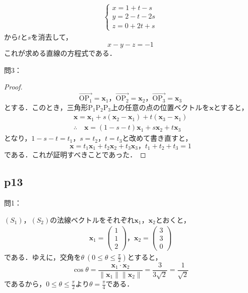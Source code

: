 \documentclass[dvipdfmx,uplatex,11pt]{jsarticle}
\theoremstyle{definition}
\begin{document}
\begin{leftbar}
    \begin{align*}
        \begin{cases}
            x=1+t-s \\
            y=2-t -2s \\
            z=0+2t+s
        \end{cases}
    \end{align*}
    から$t$と$s$を消去して，
    \[
        x-y-z=-1
    \]
    これが求める直線の方程式である．
\end{leftbar}

問3：

\begin{leftbar}
    \begin{proof}
        \[
            \overrightarrow{\mathrm{OP_1}}=\bm{x}_1，\overrightarrow{\mathrm{OP_2}}=\bm{x}_2，\overrightarrow{\mathrm{OP_3}}=\bm{x}_3
        \]
        とする．このとき，三角形$\mathrm{P_1 P_2 P_3}$上の任意の点の位置ベクトルを$\bm{x}$とすると，
        \begin{gather*}
            \bm{x}=\bm{x}_1 + s(\bm{x}_2 - \bm{x}_1) + t (\bm{x}_3 - \bm{x}_1) \\
            \therefore \quad \bm{x} = (1-s-t)\bm{x}_1 + s\bm{x}_2 + t \bm{x}_3
        \end{gather*}
        となり，$1-s-t=t_1$，$s=t_2$，$t=t_3$と改めて書き直すと，
        \[
            \bm{x} = t_1\bm{x}_1 + t_2\bm{x}_2 + t_3 \bm{x}_3，t_1+t_2+t_3=1
        \]
        である．これが証明すべきことであった．
    \end{proof}
\end{leftbar}
%
\newpage
%
\subsection{p13}
%
問1：
\begin{leftbar}
    $(S_1)$，$(S_2)$の法線ベクトルをそれぞれ$\bm{x}_1$，$\bm{x}_2$とおくと，
    \begin{gather*}
        \bm{x}_1 =
        \left(
            \begin{array}{c}
                1\\
                1\\
                2
            \end{array}
        \right)
        ，
        \bm{x}_2 =
        \left(
            \begin{array}{c}
                3\\
                3\\
                0
            \end{array}
        \right)
        \end{gather*}
        である．ゆえに，交角を$\theta ~(0 \le \theta \le \frac{\pi}{2})$とすると，
        \[
            \cos \theta = \frac{\bm{x}_1 \cdot \bm{x}_2}{\|\bm{x}_1\| \|\bm{x}_2\|}=\frac{3}{3\sqrt{2}}=\frac{1}{\sqrt{2}}
        \]
        であるから，$0 \le \theta \le \frac{\pi}{2}$より$\theta =\frac{\pi}{4}$である．
    \end{leftbar}
%
%
\newpage
%
%
%
\end{document}
